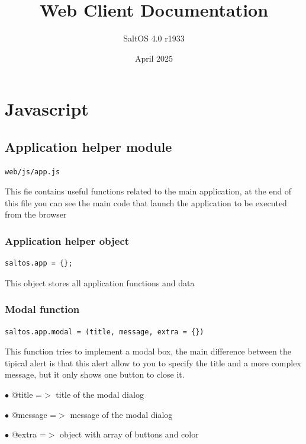 \documentclass[a4paper]{article}
\title{Web Client Documentation}
\author{SaltOS 4.0 r1933}
\begin{document}
\date{April 2025}
\maketitle
\clearpage

\tableofcontents
\clearpage


\hypertarget{toc1}{}
\section{Javascript}

\hypertarget{toc2}{}
\subsection{Application helper module}

\begin{lstlisting}
web/js/app.js
\end{lstlisting}

This fie contains useful functions related to the main application, at the end of this file you
can see the main code that launch the application to be executed from the browser

\hypertarget{toc3}{}
\subsubsection{Application helper object}

\begin{lstlisting}
saltos.app = {};
\end{lstlisting}

This object stores all application functions and data

\hypertarget{toc4}{}
\subsubsection{Modal function}

\begin{lstlisting}
saltos.app.modal = (title, message, extra = {})
\end{lstlisting}

This function tries to implement a modal box, the main difference between the tipical alert
is that this alert allow to you to specify the title and a more complex message, but it only
shows one button to close it.

\begin{compactitem}
\item[\color{myblue}$\bullet$] @title   =$>$ title of the modal dialog
\item[\color{myblue}$\bullet$] @message =$>$ message of the modal dialog
\item[\color{myblue}$\bullet$] @extra   =$>$ object with array of buttons and color
\end{compactitem}
\end{document}

